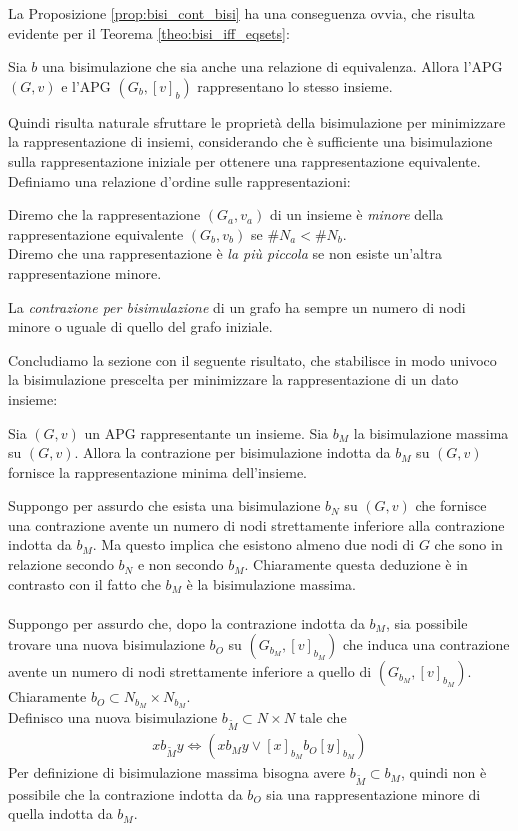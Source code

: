 La Proposizione \ref*{prop:bisi_cont_bisi} ha una conseguenza ovvia, che risulta evidente per il Teorema \ref*{theo:bisi_iff_eqsets}:
\begin{corollary}
    Sia $b$ una bisimulazione che sia anche una relazione di equivalenza. Allora l'APG $(G, v)$ e l'APG $(G_b, [v]_b)$ rappresentano lo stesso insieme.
\end{corollary}
Quindi risulta naturale sfruttare le proprietà della bisimulazione per minimizzare la rappresentazione di insiemi, considerando che è sufficiente una bisimulazione sulla rappresentazione iniziale per ottenere una rappresentazione equivalente. Definiamo una relazione d'ordine sulle rappresentazioni:
\begin{definition}
    Diremo che la rappresentazione $(G_a, v_a)$ di un insieme è \textit{minore} della rappresentazione equivalente $(G_b, v_b)$ se $\#N_a < \#N_b$.\\
    Diremo che una rappresentazione è \textit{la più piccola} se non esiste un'altra rappresentazione minore.
\end{definition}
\begin{observation}
    La \textit{contrazione per bisimulazione} di un grafo ha sempre un numero di nodi minore o uguale di quello del grafo iniziale.
\end{observation}
Concludiamo la sezione con il seguente risultato, che stabilisce in modo univoco la bisimulazione prescelta per minimizzare la rappresentazione di un dato insieme:
\begin{theorem}
    Sia $(G,v)$ un APG rappresentante un insieme. Sia $b_M$ la bisimulazione massima su $(G,v)$. Allora la contrazione per bisimulazione indotta da $b_M$ su $(G,v)$ fornisce la rappresentazione minima dell'insieme.
\end{theorem}
\begin{proof2}
    Suppongo per assurdo che esista una bisimulazione $b_N$ su $(G,v)$ che fornisce una contrazione avente un numero di nodi strettamente inferiore alla contrazione indotta da $b_M$. Ma questo implica che esistono almeno due nodi di $G$ che sono in relazione secondo $b_N$ e non secondo $b_M$. Chiaramente questa deduzione è in contrasto con il fatto che $b_M$ è la bisimulazione massima.\\\\
    Suppongo per assurdo che, dopo la contrazione indotta da $b_M$, sia possibile trovare una nuova bisimulazione $b_O$ su $(G_{b_M}, [v]_{b_M})$ che induca una contrazione avente un numero di nodi strettamente inferiore a quello di $(G_{b_M}, [v]_{b_M})$. Chiaramente $b_O \subset N_{b_M} \times N_{b_M}$.\\
    Definisco una nuova bisimulazione $b_{\widetilde{M}} \subset N \times N$ tale che
    \begin{gather*}
        x b_{\widetilde{M}} y \iff (x b_M y \lor [x]_{b_M} b_O [y]_{b_M})
    \end{gather*}
    Per definizione di bisimulazione massima bisogna avere $b_{\widetilde{M}} \subset b_M$, quindi non è possibile che la contrazione indotta da $b_O$ sia una rappresentazione minore di quella indotta da $b_M$.
\end{proof2}
